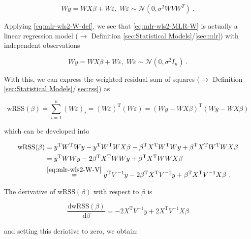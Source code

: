 \documentclass[a4paper,12pt,twoside]{book}
\begin{document}
\begin{equation} \label{eq:mlr-wls2-MLR-W}
Wy = WX\beta + W\varepsilon, \; W\varepsilon \sim \mathcal{N}(0, \sigma^2 W V W^T) \; .
\end{equation}

Applying \eqref{eq:mlr-wls2-W-def}, we see that \eqref{eq:mlr-wls2-MLR-W} is actually a linear regression model ($\rightarrow$ Definition \ref{sec:Statistical Models}/\ref{sec:mlr}) with independent observations

\begin{equation} \label{eq:mlr-wls2-MLR-W-dev}
Wy = WX\beta + W\varepsilon, \; W\varepsilon \sim \mathcal{N}(0, \sigma^2 I_n) \; .
\end{equation}

With this, we can express the weighted residual sum of squares ($\rightarrow$ Definition \ref{sec:Statistical Models}/\ref{sec:rss}) as

\begin{equation} \label{eq:mlr-wls2-wRSS}
\mathrm{wRSS}(\beta) = \sum_{i=1}^n (W \varepsilon)_i = (W \varepsilon)^\mathrm{T} (W \varepsilon) = (Wy-WX\beta)^\mathrm{T} (Wy-WX\beta)
\end{equation}

which can be developed into

\begin{equation} \label{eq:mlr-wls2-wRSS-dev}
\begin{split}
\mathrm{wRSS}(\beta) &= y^\mathrm{T} W^\mathrm{T} W y - y^\mathrm{T} W^\mathrm{T} W X \beta - \beta^\mathrm{T} X^\mathrm{T} W^\mathrm{T} W y + \beta^\mathrm{T} X^\mathrm{T} W^\mathrm{T} W X \beta \\
&= y^\mathrm{T} W W y - 2 \beta^\mathrm{T} X^\mathrm{T} W W y + \beta^\mathrm{T} X^\mathrm{T} W W X \beta \\
&\overset{\eqref{eq:mlr-wls2-W-V}}{=} y^\mathrm{T} V^{-1} y - 2 \beta^\mathrm{T} X^\mathrm{T} V^{-1} y + \beta^\mathrm{T} X^\mathrm{T} V^{-1} X \beta \; .
\end{split}
\end{equation}

The derivative of $\mathrm{wRSS}(\beta)$ with respect to $\beta$ is

\begin{equation} \label{eq:mlr-wls2-wRSS-der}
\frac{\mathrm{d}\mathrm{wRSS}(\beta)}{\mathrm{d}\beta} = - 2 X^\mathrm{T} V^{-1} y + 2 X^\mathrm{T} V^{-1} X \beta
\end{equation}

and setting this deriative to zero, we obtain:
\end{document}
